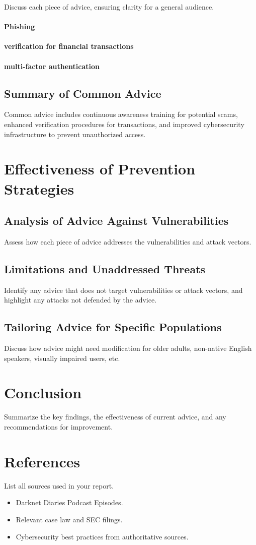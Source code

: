 \documentclass[11pt]{article}
\begin{document}
Discuss each piece of advice, ensuring clarity for a general audience.
\paragraph*{Phishing}
\paragraph*{verification for financial transactions}

\paragraph*{multi-factor authentication}
\subsection{Summary of Common Advice}
Common advice includes continuous awareness training for potential scams, enhanced verification procedures for transactions, and improved cybersecurity infrastructure to prevent unauthorized access.


\section{Effectiveness of Prevention Strategies}
\subsection{Analysis of Advice Against Vulnerabilities}
Assess how each piece of advice addresses the vulnerabilities and attack vectors.

\subsection{Limitations and Unaddressed Threats}
Identify any advice that does not target vulnerabilities or attack vectors, and highlight any attacks not defended by the advice.

\subsection{Tailoring Advice for Specific Populations}
Discuss how advice might need modification for older adults, non-native English speakers, visually impaired users, etc.

\section{Conclusion}
Summarize the key findings, the effectiveness of current advice, and any recommendations for improvement.

\section{References}
List all sources used in your report.
\begin{itemize}
\item Darknet Diaries Podcast Episodes.
\item Relevant case law and SEC filings.
\item Cybersecurity best practices from authoritative sources.
\end{itemize}
\end{document}
